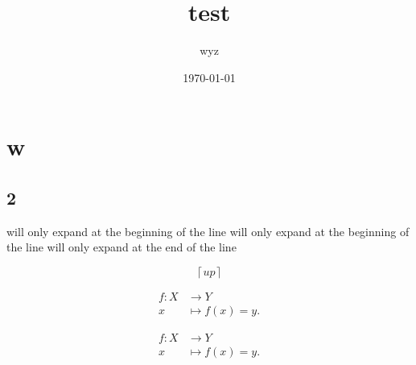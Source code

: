 \documentclass{article}
\title{test}
\author{wyz}
\date{\today}
\begin{document}
\maketitle
\section{w}
\subsection{2}

will only expand at the beginning of the line will only expand at the beginning of the line will only expand at the end of the line

\[
  \left\lceil up \right\rceil 
\]

\begin{align*}
  f: X&\longrightarrow Y \\
  x&\longmapsto f(x) = y
.\end{align*}

\begin{equation}
\begin{aligned}
  f: X&\longrightarrow Y \\
  x&\longmapsto f(x) = y
.\end{aligned}
\end{equation}
\end{document}

